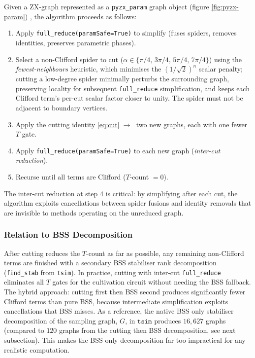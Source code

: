 \documentclass[a4paper,onecolumn,11pt,accepted=2026-06-10]{quantumarticle}
\begin{document}
Given a ZX-graph represented as a \texttt{pyzx\_param} graph object
(figure \ref{fig:pyzx-param}) \cite{pyzx_param}, the algorithm proceeds as follows:
\begin{enumerate}
    \item Apply \texttt{full\_reduce(paramSafe=True)} to simplify
          (fuses spiders, removes identities, preserves parametric phases).
    \item Select a non-Clifford spider to cut
          ($\alpha \in \{\pi/4,\, 3\pi/4,\, 5\pi/4,\, 7\pi/4\}$) using the
          \textit{fewest-neighbours} heuristic, which minimises the
          $(1/\sqrt{2})^n$ scalar penalty; cutting a low-degree spider minimally perturbs the surrounding graph, preserving locality for subsequent \texttt{full\_reduce} simplification, and keeps each Clifford term's per-cut scalar factor closer to unity. The spider must not be adjacent
          to boundary vertices.
    \item Apply the cutting identity \eqref{eq:cut}$\;\to\;$ two new graphs,
          each with one fewer $T$ gate.
    \item Apply \texttt{full\_reduce(paramSafe=True)} to each new graph
          (\textit{inter-cut reduction}).
    \item Recurse until all terms are Clifford ($T$-count $= 0$).
\end{enumerate}
The inter-cut reduction at step 4 is critical: by simplifying after each cut, the algorithm exploits cancellations between spider fusions and identity removals that are invisible to methods operating on the unreduced graph.

\subsubsection{Relation to BSS Decomposition}
\label{sec:bss-relation}

After cutting reduces the $T$-count as far as possible, any remaining non-Clifford terms are finished with a secondary BSS stabiliser rank decomposition~\cite{BSS2016, kissinger2022reduced, sutcliffe2024fast}
(\texttt{find\_stab} from \texttt{tsim}). In practice, cutting with inter-cut \texttt{full\_reduce} eliminates all $T$ gates for the cultivation circuit without needing the BSS fallback. The hybrid approach: cutting first then BSS second produces significantly fewer Clifford terms than pure BSS, because intermediate simplification exploits cancellations that BSS misses. As a reference, the native BSS only stabiliser decomposition of the sampling graph, $G$, in $\mathtt{tsim}$ produces $16{,}627$ graphs (compared to $120$ graphs from the cutting then BSS decomposition, see next subsection). This makes the BSS only decomposition far too impractical for any realistic computation.
\end{document}
